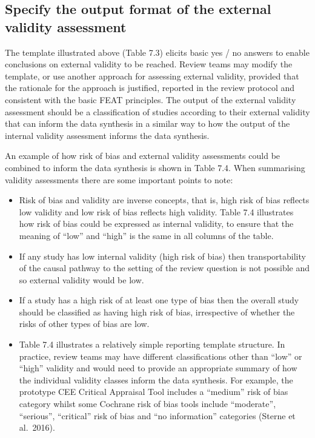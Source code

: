 \documentclass[
  letterpaper,
  DIV=11,
  numbers=noendperiod]{scrreprt}
\begin{document}
\subsection{Specify the output format of the external validity
assessment}\label{specify-the-output-format-of-the-external-validity-assessment}

The template illustrated above (Table 7.3) elicits basic yes / no
answers to enable conclusions on external validity to be reached. Review
teams may modify the template, or use another approach for assessing
external validity, provided that the rationale for the approach is
justified, reported in the review protocol and consistent with the basic
FEAT principles. The output of the external validity assessment should
be a classification of studies according to their external validity that
can inform the data synthesis in a similar way to how the output of the
internal validity assessment informs the data synthesis.

An example of how risk of bias and external validity assessments could
be combined to inform the data synthesis is shown in Table 7.4. When
summarising validity assessments there are some important points to
note:

\begin{itemize}
\item
  Risk of bias and validity are inverse concepts, that is, high risk of
  bias reflects low validity and low risk of bias reflects high
  validity. Table 7.4 illustrates how risk of bias could be expressed as
  internal validity, to ensure that the meaning of ``low'' and ``high''
  is the same in all columns of the table.
\item
  If any study has low internal validity (high risk of bias) then
  transportability of the causal pathway to the setting of the review
  question is not possible and so external validity would be low.
\item
  If a study has a high risk of at least one type of bias then the
  overall study should be classified as having high risk of bias,
  irrespective of whether the risks of other types of bias are low.
\item
  Table 7.4 illustrates a relatively simple reporting template
  structure. In practice, review teams may have different
  classifications other than ``low'' or ``high'' validity and would need
  to provide an appropriate summary of how the individual validity
  classes inform the data synthesis. For example, the prototype CEE
  Critical Appraisal Tool includes a ``medium'' risk of bias category
  whilst some Cochrane risk of bias tools include ``moderate'',
  ``serious'', ``critical'' risk of bias and ``no information''
  categories (Sterne et al.~2016).
\end{itemize}
\end{document}
